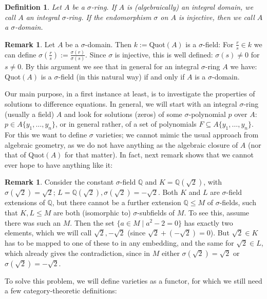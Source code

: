 \documentclass{article}
\def\Q{\mathbb{Q}}
\def\s{\sigma}
\theoremstyle{plain}
\newtheorem{defn}[Satz]{Definition}
\theoremstyle{definition}
\newtheorem{rem}[Satz]{Remark}
\begin{document}
\begin{defn}
Let $A$ be a $\s$-ring. If $A$ is (algebraically) an integral domain, we call $A$ an integral $\s$-ring. If the endomorphism $\s$ on $A$ is injective, then we call $A$ a $\s$-domain.
\end{defn}

\begin{rem}\label{sdomain=field}
Let $A$ be a $\s$-domain. Then $k:=$Quot$(A)$ is a $\s$-field: For $\frac{r}{s} \in k$ we can define $\s(\frac{r}{s}):= \frac{\s(r)}{\s(s)}$. Since $\s$ is injective, this is well defined: $\s(s) \neq 0$ for $s \neq 0$.
By this argument we see that in general for an integral $\s$-ring $A$ we have: Quot$(A)$ is a $\s$-field (in this natural way) if and only if $A$ is a $\s$-domain.
\end{rem}

Our main purpose, in a first instance at least, is to investigate the properties of solutions to difference equations. 
In general, we will start with an integral $\s$-ring (usually a field) $A$ %
and look for solutions (zeros) of some $\s$-polynomial $p$ over $A$: $p \in A\{y_1, \ldots, y_n \}$, or in general rather, of a set of polynomials $F \subseteq A\{y_1, \ldots, y_n \}$. 
For this we want to define $\s$ varieties; we cannot mimic the usual approach from algebraic geometry, as we do not have anything as the algebraic closure of $A$ (nor that of Quot$(A)$ for that matter). 
In fact, next remark shows that we cannot ever hope to have anything like it:

\begin{rem}\label{incompatibleextensions}
 Consider the constant $\s$-field $\Q$ and $K = \Q(\sqrt{2})$, with $\s (\sqrt{2}) = \sqrt{2}$; $L = \Q(\sqrt{2}), \s(\sqrt{2}) = - \sqrt{2}$. 
Both $K$ and $L$ are $\s$-field extensions of $\Q$, but there cannot be a further extension $\Q \leq M$ of $\s$-fields, such that $K,L \leq M$ are both (isomorphic to) $\s$-subfields of $M$. 
To see this, assume there was such an $M$. Then the set $\{ a \in M \mid a^2 - 2 = 0 \}$ has exactly two elements, which we will call $\sqrt{2}, -\sqrt{2}$ (since $\sqrt{2} + (- \sqrt{2}) = 0$).
But $\sqrt{2} \in K$ has to be mapped to one of these to in any embedding, and the same for $\sqrt{2} \in L$, which already gives the contradiction,
 since in $M$ either $\s(\sqrt{2}) = \sqrt{2}$ or $\s(\sqrt{2}) = -\sqrt{2}$.
\end{rem}

To solve this problem, we will define varieties as a functor, for which we still need a few category-theoretic definitions:
\end{document}
